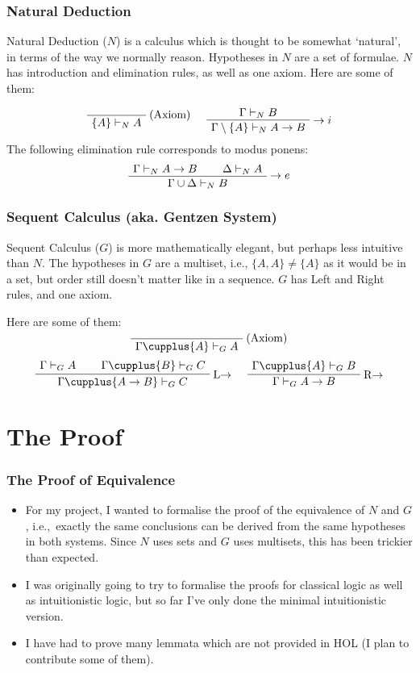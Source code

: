 \documentclass[english,svgnames,hide notes,12pt]{beamer}
\theoremstyle{definition}
\theoremstyle{remark}
\begin{document}
\begin{frame}
    \frametitle{Natural Deduction}
    Natural Deduction ($N$) is a calculus which is thought to be somewhat `natural', in terms of the way we normally reason. Hypotheses in $N$ are a set of formulae. $N$ has introduction and elimination rules, as well as one axiom. Here are some of them:

    \[
        \AxiomC{}
        \RightLabel{(Axiom)}
        \UnaryInfC{$\{A\} \vdash_N A$}
        \DisplayProof
        \hspace{0.5cm}
        \AxiomC{$\Gamma \vdash_N B$}
        \RightLabel{$\to i$}
        \UnaryInfC{$\Gamma\setminus\{A\}\vdash_N A\to B$}
        \DisplayProof
    \]
    The following elimination rule corresponds to modus ponens:
    \[
        \AxiomC{$\Gamma\vdash_N A\to B$}
        \AxiomC{$\Delta\vdash_N A$}
        \RightLabel{$\to e$}
        \BinaryInfC{$\Gamma\cup\Delta\vdash_N B$}
        \DisplayProof
    \]
\end{frame}


\begin{frame}
    \frametitle{Sequent Calculus (aka. Gentzen System)}
    Sequent Calculus ($G$) is more mathematically elegant, but perhaps less intuitive than $N$. The hypotheses in $G$ are a multiset, i.e., $\{A,A\}\neq\{A\}$ as it would be in a set, but order still doesn't matter like in a sequence. $G$ has Left and Right rules, and one axiom.

    Here are some of them:
    \[
        \AxiomC{}
        \RightLabel{(Axiom)}
        \UnaryInfC{$\Gamma \cupplus \{A\}\vdash_G A$}
        \DisplayProof
    \]
    \[
        \AxiomC{$\Gamma\vdash_G A$}
        \AxiomC{$\Gamma\cupplus\{B\}\vdash_G C$}
        \RightLabel{L$\to$}
        \BinaryInfC{$\Gamma\cupplus\{A\to B\}\vdash_G C$}
        \DisplayProof
        \hspace{0.5cm}
        \AxiomC{$\Gamma\cupplus\{A\}\vdash_G B$}
        \RightLabel{R$\to$}
        \UnaryInfC{$\Gamma\vdash_G A\to B$}
        \DisplayProof
    \]
\end{frame}

\section{The Proof}

\begin{frame}
    \frametitle{The Proof of Equivalence}
    \begin{itemize}
        \item For my project, I wanted to formalise the proof of the equivalence of $N$ and $G$, i.e.,\ exactly the same conclusions can be derived from the same hypotheses in both systems. Since $N$ uses sets and $G$ uses multisets, this has been trickier than expected.
        \item I was originally going to try to formalise the proofs for classical logic as well as intuitionistic logic, but so far I've only done the minimal intuitionistic version.
        \item I have had to prove many lemmata which are not provided in HOL (I plan to contribute some of them).
    \end{itemize}
\end{frame}
\end{document}
